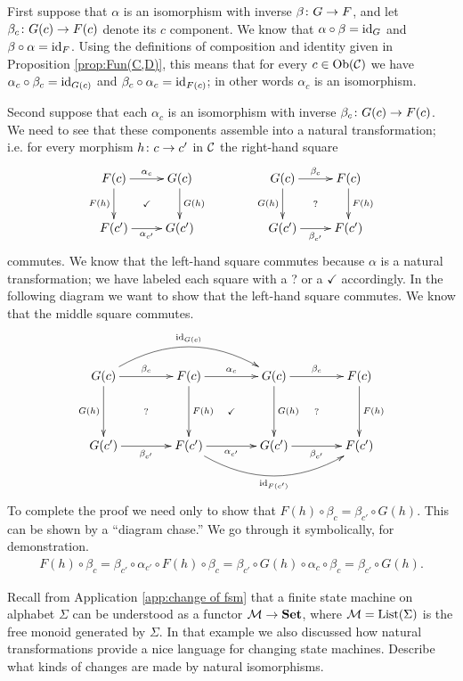 \documentclass[CT4S-EN-RU]{subfiles}
\begin{document}
\begin{proofENG}
First suppose that $\alpha$ is an isomorphism with inverse $\beta\colon G\rightarrow F$, and let $\beta_c\colon G(c)\rightarrow F(c)$ denote its $c$ component. We know that $\alpha\circ\beta=\textnormal{id}_G$ and $\beta\circ\alpha=\textnormal{id}_F$. Using the definitions of composition and identity given in Proposition \ref{prop:Fun(C,D)}, this means that for every $c\in\textnormal{Ob}(\mathcal{C})$ we have $\alpha_c\circ\beta_c=\textnormal{id}_{G(c)}$ and $\beta_c\circ\alpha_c=\textnormal{id}_{F(c)}$; in other words $\alpha_c$ is an isomorphism.

Second suppose that each $\alpha_c$ is an isomorphism with inverse $\beta_c\colon G(c)\rightarrow F(c)$. We need to see that these components assemble into a natural transformation; i.e. for every morphism $h\colon c\rightarrow c'$ in $\mathcal{C}$ the right-hand square 
$$
\xymatrix{F(c)\ar@{}[dr]|{\checkmark}\ar[d]_{F(h)}\ar[r]^{\alpha_c}&G(c)\ar[d]^{G(h)}\\F(c')\ar[r]_{\alpha_{c'}}&G(c')}\hspace{.5in}
\xymatrix{G(c)\ar@{}[dr]|{?}\ar[d]_{G(h)}\ar[r]^{\beta_c}&F(c)\ar[d]^{F(h)}\\G(c')\ar[r]_{\beta_{c'}}&F(c')}
$$
commutes. We know that the left-hand square commutes because $\alpha$ is a natural transformation; we have labeled each square with a ? or a $\checkmark$ accordingly. In the following diagram we want to show that the left-hand square commutes. We know that the middle square commutes.
$$
\xymatrix@=40pt{G(c)\ar@/^2pc/[rr]^{\id_{G(c)}}\ar@{}[dr]|{?}\ar[d]_{G(h)}\ar[r]^{\beta_c}&F(c)\ar@{}[dr]|{\checkmark}\ar[d]^{F(h)}\ar[r]^{\alpha_c}&G(c)\ar@{}[dr]|{?}\ar[d]^{G(h)}\ar[r]^{\beta_c}&F(c)\ar[d]^{F(h)}\\
G(c')\ar[r]_{\beta_{c'}}&F(c')\ar[r]_{\alpha_{c'}}\ar@/_2pc/[rr]_{\id_{F(c')}}&G(c')\ar[r]_{\beta_{c'}}&F(c')}
$$
To complete the proof we need only to show that $F(h)\circ\beta_c=\beta_{c'}\circ G(h)$. This can be shown by a “diagram chase.” We go through it symbolically, for demonstration.
\begin{align*}
F(h)\circ\beta_c=\beta_{c'}\circ\alpha_{c'}\circ F(h)\circ\beta_c=\beta_{c'}\circ G(h)\circ\alpha_c\circ\beta_c=\beta_{c'}\circ G(h).
\end{align*}
\end{proofENG}

\begin{proofRUS}
\end{proofRUS}

\begin{exerciseENG}
Recall from Application \ref{app:change of fsm} that a finite state machine on alphabet $\Sigma$ can be understood as a functor $\mathcal{M}\rightarrow{\bf Set}$, where $\mathcal{M}=\textnormal{List}(\Sigma)$ is the free monoid generated by $\Sigma$. In that example we also discussed how natural transformations provide a nice language for changing state machines. Describe what kinds of changes are made by natural isomorphisms.
\end{exerciseENG}
\end{document}
